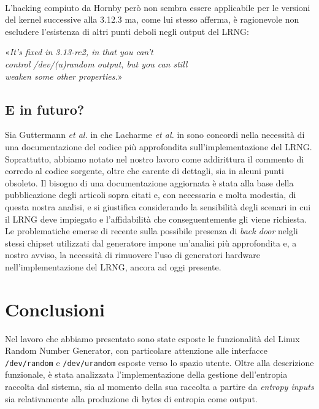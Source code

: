 \documentclass{article}
\begin{document}
 \paragraph{}L'hacking compiuto da Hornby però non sembra essere applicabile per
 le versioni del kernel successive alla 3.12.3 ma, come lui stesso afferma, è
 ragionevole non escludere l'esistenza di altri punti deboli negli output del
 LRNG:
 \begin{center}
 «\emph{It's fixed in 3.13-rc2, in that you can't \\
 control /dev/(u)random output, but you can still \\
 weaken some other properties.}»
 \end{center}
 
 \subsection{E in futuro?}
 Sia Guttermann \emph{et al.} in \cite{gutt} che Lacharme \emph{et al.} in
 \cite{lach} sono concordi nella necessità di una documentazione del codice più
 approfondita sull'implementazione del LRNG. Soprattutto, abbiamo notato
 nel nostro lavoro come addirittura il commento di corredo al codice sorgente, oltre
 che carente di dettagli, sia in alcuni punti obsoleto. Il bisogno di una
 documentazione aggiornata è stata alla base della pubblicazione degli articoli
 sopra citati e, con necessaria e molta modestia, di questa nostra analisi, e si
 giustifica considerando la sensibilità degli scenari in cui il LRNG deve
 impiegato e l'affidabilità che conseguentemente gli viene richiesta.
 Le problematiche emerse di recente sulla possibile presenza di \emph{back door}
 nelgli stessi chipset utilizzati dal generatore impone un'analisi più
 approfondita e, a nostro avviso, la necessità di rimuovere l'uso
 di generatori hardware nell'implementazione del LRNG, ancora ad oggi presente.
 
 
 
 \section*{Conclusioni}
 Nel lavoro che abbiamo presentato sono state esposte le funzionalità del Linux
 Random Number Generator, con particolare attenzione alle interfacce
 \verb+/dev/random+ e \verb+/dev/urandom+ esposte verso lo spazio utente.
 Oltre alla descrizione funzionale, è stata analizzata l'implementazione della
 gestione dell'entropia raccolta dal sistema, sia al momento della sua raccolta
 a partire da \emph{entropy inputs} sia relativamente alla produzione di bytes
 di entropia come output.
 
   
   
\end{document}
